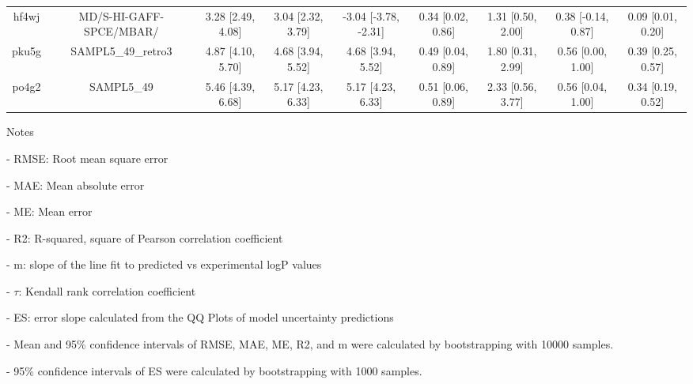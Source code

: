 \documentclass{article}
\begin{document}
\begin{center}
\begin{longtable}{|ccccccccc|}
 hf4wj &                            MD/S-HI-GAFF-SPCE/MBAR/ &  3.28 [2.49, 4.08] &  3.04 [2.32, 3.79] &  -3.04 [-3.78, -2.31] &  0.34 [0.02, 0.86] &    1.31 [0.50, 2.00] &   0.38 [-0.14, 0.87] &     0.09 [0.01, 0.20] \\
 pku5g &                                 SAMPL5\_49\_retro3 &  4.87 [4.10, 5.70] &  4.68 [3.94, 5.52] &     4.68 [3.94, 5.52] &  0.49 [0.04, 0.89] &    1.80 [0.31, 2.99] &    0.56 [0.00, 1.00] &     0.39 [0.25, 0.57] \\
 po4g2 &                                         SAMPL5\_49 &  5.46 [4.39, 6.68] &  5.17 [4.23, 6.33] &     5.17 [4.23, 6.33] &  0.51 [0.06, 0.89] &    2.33 [0.56, 3.77] &    0.56 [0.04, 1.00] &     0.34 [0.19, 0.52] \\
\end{longtable}
\end{center}

Notes

- RMSE: Root mean square error

- MAE: Mean absolute error

- ME: Mean error

- R2: R-squared, square of Pearson correlation coefficient

- m: slope of the line fit to predicted vs experimental logP values

- $\tau$:  Kendall rank correlation coefficient

- ES: error slope calculated from the QQ Plots of model uncertainty predictions

- Mean and 95\% confidence intervals of RMSE, MAE, ME, R2, and m were calculated by bootstrapping with 10000 samples.

- 95\% confidence intervals of ES were calculated by bootstrapping with 1000 samples.\end{document}
\end{document}
